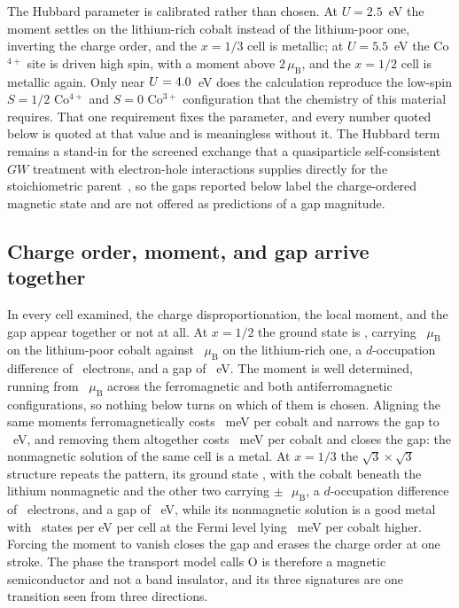 \documentclass[reprint,twocolumn,prb,amsmath,amssymb,superscriptaddress,floatfix]{revtex4-2}
\newcommand{\muBs}{\mu_{\mathrm{B}}}
\begin{document}
The Hubbard parameter is calibrated rather than chosen. At $U=2.5$~eV the moment settles on the
lithium-rich cobalt instead of the lithium-poor one, inverting the charge order, and the
$x=1/3$ cell is metallic; at $U=5.5$~eV the Co$^{4+}$ site is driven high spin, with a moment
above $2\,\muBs$, and the $x=1/2$ cell is metallic again. Only near $U=4.0$~eV does the
calculation reproduce the low-spin $S=1/2$ Co$^{4+}$ and $S=0$ Co$^{3+}$ configuration that the
chemistry of this material requires. That one requirement fixes the parameter, and every number
quoted below is quoted at that value and is meaningless without it. The Hubbard term remains a
stand-in for the screened exchange that a quasiparticle self-consistent $GW$ treatment with
electron-hole interactions supplies directly for the stoichiometric
parent~\cite{Radha2021c,Radha2023erratum}, so the gaps reported below label the charge-ordered
magnetic state and are not offered as predictions of a gap magnitude.

\subsection{Charge order, moment, and gap arrive together}

In every cell examined, the charge disproportionation, the local moment, and the gap appear
together or not at all. At $x=1/2$ the ground state is \magorderRow, carrying
\comomentRow~$\muBs$ on the lithium-poor cobalt against \comomentThreeRow~$\muBs$ on the
lithium-rich one, a $d$-occupation difference of \dnRow~electrons, and a gap of \gapRow~eV. The
moment is well determined, running from \comomentRowRange~$\muBs$ across the ferromagnetic and
both antiferromagnetic configurations, so nothing below turns on which of them is chosen. Aligning the same moments ferromagnetically costs \efmafmRow~meV per cobalt and
narrows the gap to \gapRowFM~eV, and removing them altogether costs \enmRow~meV per cobalt and
closes the gap: the nonmagnetic solution of the same cell is a metal. At $x=1/3$ the
$\sqrt3\times\sqrt3$ structure repeats the pattern, its ground state \magorderXthird, with the
cobalt beneath the lithium nonmagnetic and the other two carrying $\pm\,$\comomentXthird~$\muBs$, a $d$-occupation
difference of \dnXthird~electrons, and a gap of \gapXthird~eV, while its nonmagnetic solution is
a good metal with \dosXthirdNM~states per eV per cell at the Fermi level lying \enmXthird~meV
per cobalt higher. Forcing the moment to vanish closes the gap and erases the charge order at
one stroke. The phase the transport model calls O is therefore a magnetic semiconductor and not
a band insulator, and its three signatures are one transition seen from three directions.
\end{document}
